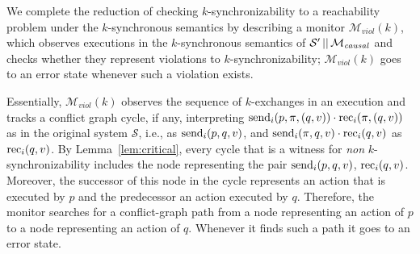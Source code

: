We complete the reduction of checking $k$-synchronizability to a reachability problem under the $k$-synchronous semantics by describing a monitor $\mathcal{M}_{\mathit{viol}}(k)$, which observes executions in the $k$-synchronous semantics of $\mathcal{S}' \,||\,\mathcal{M}_{\mathit{causal}}$ and checks whether they represent violations to $k$-synchronizability; $\mathcal{M}_{\mathit{viol}}(k)$ goes to an error state whenever such a violation exists. 

Essentially, $\mathcal{M}_{\mathit{viol}}(k)$ observes the sequence of $k$-exchanges in an execution and tracks a conflict graph cycle, if any, interpreting $\mathrm{send}_{i}({p,\pi,(q,v)})\cdot\mathrm{rec}_{i}({\pi,(q,v)})$ as in the original system $\mathcal{S}$, i.e., as $\mathrm{send}_{i}({p,q,v})$, and $\mathrm{send}_{i}({\pi,q,v})\cdot \mathrm{rec}_{i}({q,v})$ as $\mathrm{rec}_{i}({q,v})$. 
By Lemma~\ref{lem:critical}, every cycle that is a witness for \emph{non} $k$-synchronizability includes the node representing the pair $\mathrm{send}_{i}({p,q,v})$, $\mathrm{rec}_{i}({q,v})$. Moreover, the successor of this node in the cycle represents an action that is executed by $p$ and the predecessor an action executed by $q$. Therefore, the monitor searches for a conflict-graph path from a node representing an action of $p$ to a node representing an action of $q$. Whenever it finds such a path it goes to an error state.

